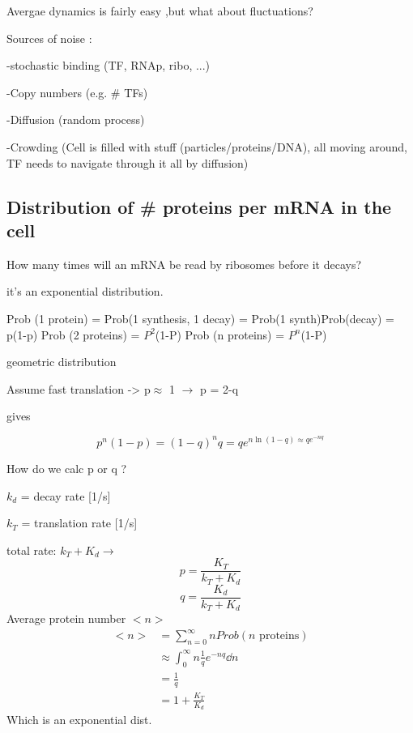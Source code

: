 \documentclass{article}
\begin{document}


Avergae dynamics is fairly easy ,but what about fluctuations? 

Sources of noise : 

-stochastic binding (TF, RNAp, ribo, ...)

-Copy numbers (e.g. \# TFs)

-Diffusion (random process)

-Crowding (Cell is filled with stuff (particles/proteins/DNA), all moving around, TF needs to navigate through it all by diffusion)

\subsection{Distribution of \# proteins per mRNA in the cell}
How many times will an mRNA be read by ribosomes before it decays? 

it's an exponential distribution. 

Prob (1 protein) = Prob(1 synthesis, 1 decay) = Prob(1 synth)Prob(decay) = p(1-p)
Prob (2 proteins)  = $P^2$(1-P)
Prob (n proteins)  = $P^n$(1-P)

geometric distribution

Assume fast translation -> p$\approx$ 1 $\longrightarrow$ p = 2-q

gives

\begin{equation}
	p^n(1-p) = (1-q)^nq = q e^{n\ln(1-q)\approx q e^{-nq}}
\end{equation}

How do we calc p or q ? 

$k_d$ = decay rate [1/s]

$k_T$ = translation rate [1/s]

total rate: $k_T + K_d \longrightarrow$
\begin{equation}
	p = \frac{K_T}{k_T + K_d}
\end{equation}
\begin{equation}
	q = \frac{K_d}{k_T + K_d}
\end{equation}
Average protein number $<n>$
\begin{equation}
	\begin{split}
		<n> &= \sum_{n =0 }^\infty n Prob(n \text{ proteins})\\
			&\approx \int _0 ^\infty n \frac{1}{q}e^{-nq}\dd n \\
			&= \frac{1}{q}\\
			&= 1 + \frac{K_T}{K_d}
	\end{split}
\end{equation}
Which is an exponential dist. 
\end{document}
